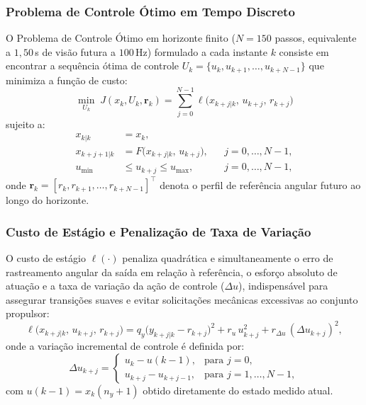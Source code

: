 \subsubsection*{Problema de Controle Ótimo em Tempo Discreto}

O Problema de Controle Ótimo em horizonte finito ($N = 150$ passos, equivalente a $1{,}50$\,s de visão futura a $100$\,Hz) formulado a cada instante $k$ consiste em encontrar a sequência ótima de controle $U_k = \{u_k, u_{k+1}, \dots, u_{k+N-1}\}$ que minimiza a função de custo:
\begin{equation}
    \min_{U_k}\; J(x_k, U_k, \mathbf{r}_k) = \sum_{j=0}^{N-1} \ell\bigl(x_{k+j|k},\, u_{k+j},\, r_{k+j}\bigr)
    \label{eq:ocp}
\end{equation}
\noindent sujeito a:
\begin{align}
    x_{k|k} &= x_k, \label{eq:ocp_ic} \\
    x_{k+j+1|k} &= F\bigl(x_{k+j|k},\, u_{k+j}\bigr), && j = 0, \ldots, N-1, \label{eq:ocp_dinamica} \\
    u_{\min} &\leq u_{k+j} \leq u_{\max}, && j = 0, \ldots, N-1, \label{eq:ocp_u}
\end{align}
\noindent onde $\mathbf{r}_k = [r_k, r_{k+1}, \dots, r_{k+N-1}]^\top$ denota o perfil de referência angular futuro ao longo do horizonte.

\subsubsection*{Custo de Estágio e Penalização de Taxa de Variação}

O custo de estágio $\ell(\cdot)$ penaliza quadrática e simultaneamente o erro de rastreamento angular da saída em relação à referência, o esforço absoluto de atuação e a taxa de variação da ação de controle ($\Delta u$), indispensável para assegurar transições suaves e evitar solicitações mecânicas excessivas ao conjunto propulsor:
\begin{equation}
    \ell\bigl(x_{k+j|k},\, u_{k+j},\, r_{k+j}\bigr) = 
    q_y \bigl(y_{k+j|k} - r_{k+j}\bigr)^2 + r_u \, u_{k+j}^2 + r_{\Delta u} \, (\Delta u_{k+j})^2,
    \label{eq:custo_estagio}
\end{equation}
\noindent onde a variação incremental de controle é definida por:
\begin{equation}
    \Delta u_{k+j} = \begin{cases}
        u_k - u(k-1), & \text{para } j = 0, \\
        u_{k+j} - u_{k+j-1}, & \text{para } j = 1, \ldots, N-1,
    \end{cases}
    \label{eq:delta_u}
\end{equation}
\noindent com $u(k-1) = x_k(n_y + 1)$ obtido diretamente do estado medido atual.

